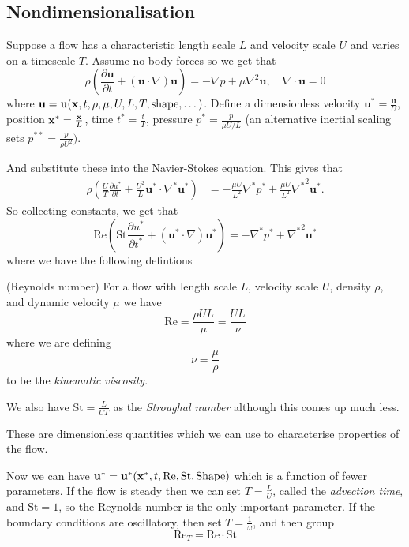 \documentclass{article}
\begin{document}
\subsection{Nondimensionalisation}
Suppose a flow has a characteristic length scale $ L $ and velocity scale $ U $ and varies on a timescale $ T $. Assume no body forces so we get that
\[
	\rho\left(\frac{\partial \mathbf u}{\partial t} + (\mathbf u\cdot\nabla)\mathbf u\right) = - \nabla p + \mu \nabla^2 \mathbf u, \quad \nabla \cdot\mathbf u = 0
\]
where $ \mathbf u = \mathbf u(\mathbf{x},t,\rho,\mu,U,L,T,\text{shape},\dots) $. Define a dimensionless velocity $ \mathbf u^* = \frac{\mathbf u}U $, position $ \mathbf{x}^* = \frac {\mathbf{x}} L $, time $ t^* = \frac tT $, pressure $ p^* = \frac p{\mu U/L} $ (an alternative inertial scaling sets $ p^{**} = \frac{p}{\rho U^2}) $.\par
And substitute these into the Navier-Stokes equation. This gives that
\begin{align*}
	\rho \left(\frac UT \frac{\partial u^*}{\partial t} + \frac {U^2}L \mathbf u^* \cdot \nabla^* \mathbf u^*\right) &= - \frac{\mu U}{L^2} \nabla^* p^* + \frac{\mu U}{L^2} {\nabla^*}^2 \mathbf u^*.
\end{align*}
So collecting constants, we get that
\[
	\mathrm{Re}\left(\mathrm{St}\frac{\partial u^*}{\partial t^*} + (\mathbf u^* \cdot\nabla)\mathbf u^*\right) = -\nabla^* p^* + {\nabla^*}^2 \mathbf u^*
\]
where we have the following defintions
\begin{definition}
	(Reynolds number) For a flow with length scale $ L $, velocity scale $ U $, density $ \rho $, and dynamic velocity $ \mu $ we have
	\[
		\mathrm{Re} = \frac{\rho UL}{\mu} = \frac{UL}{\nu}
	\]
	where we are defining 
	\[
		\nu = \frac{\mu}\rho
	\]
	to be the \textit{kinematic viscosity}.
\end{definition}
We also have $ \mathrm{St} = \frac L{UT} $ as the \textit{Stroughal number} although this comes up much less.
\par These are dimensionless quantities which we can use to characterise properties of the flow. \par
Now we can have $ \mathbf u^* = \mathbf u^*(\mathbf{x}^*,t,\mathrm{Re}, \mathrm{St}, \mathrm{Shape}) $ which is a function of fewer parameters. If the flow is steady then we can set $ T = \frac LU $, called the \textit{advection time}, and $ \mathrm{St} = 1 $, so the Reynolds number is the only important parameter. If the boundary conditions are oscillatory, then set $ T = \frac 1 \omega $, and then group 
\[
	\mathrm{Re}_T = \mathrm{Re} \cdot \mathrm{St}
\]
\end{document}
